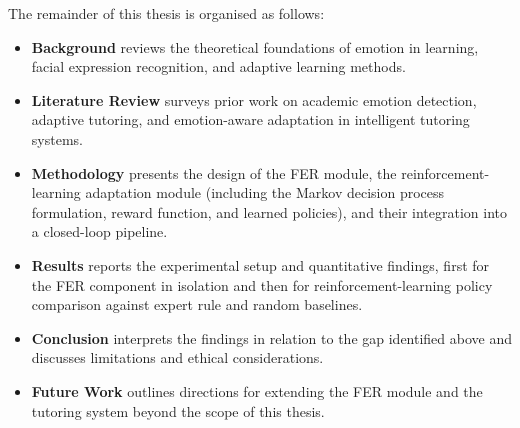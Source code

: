 The remainder of this thesis is organised as follows:

\begin{itemize}
  \item \textbf{Background} reviews the theoretical foundations of emotion in learning, facial expression recognition, and adaptive learning methods.
  \item \textbf{Literature Review} surveys prior work on academic emotion detection, adaptive tutoring, and emotion-aware adaptation in intelligent tutoring systems.
  \item \textbf{Methodology} presents the design of the FER module, the reinforcement-learning adaptation module (including the Markov decision process formulation, reward function, and learned policies), and their integration into a closed-loop pipeline.
  \item \textbf{Results} reports the experimental setup and quantitative findings, first for the FER component in isolation and then for reinforcement-learning policy comparison against expert rule and random baselines.
  \item \textbf{Conclusion} interprets the findings in relation to the gap identified above and discusses limitations and ethical considerations.
  \item \textbf{Future Work} outlines directions for extending the FER module and the tutoring system beyond the scope of this thesis.
\end{itemize}
